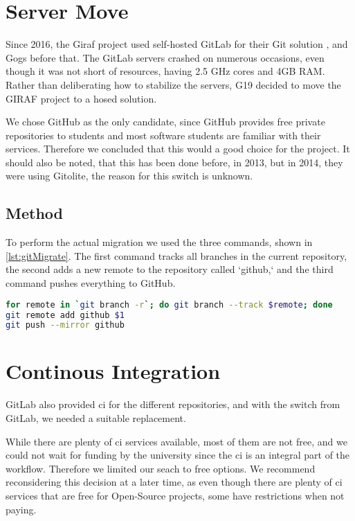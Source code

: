 \section{Server Move} \label{sec:GitAndCI}

Since 2016\cite{SW611F16}, the Giraf project used self-hosted GitLab for their Git solution , and Gogs before that\cite{SW603F15}. The GitLab servers crashed on numerous occasions, even though it was not short of resources, having 2.5 GHz cores and 4GB RAM. Rather than deliberating how to stabilize the servers, \gls{G19} decided to move the GIRAF project to a hosed solution.

We chose GitHub as the only candidate, since GitHub provides free private repositories to students and most software students are familiar with their services. Therefore we concluded that this would a good choice for the project. It should also be noted, that this has been done before, in 2013\cite{SW601F13}, but in 2014, they were using Gitolite\cite{SW613F14}, the reason for this switch is unknown.

\subsection{Method}

To perform the actual migration we used the three commands, shown in \autoref{lst:gitMigrate}. The first command tracks all branches in the current repository, the second adds a new remote to the repository called `github,` and the third command pushes everything to GitHub.

\begin{lstlisting}[language=bash,label={lst:gitMigrate},caption={Git Migration code}]
for remote in `git branch -r`; do git branch --track $remote; done
git remote add github $1
git push --mirror github
\end{lstlisting}

\section{Continous Integration}

GitLab also provided \gls{ci} for the different repositories, and with the switch from GitLab, we needed a suitable replacement.

While there are plenty of \gls{ci} services available, most of them are not free, and we could not wait for funding by the university since the \gls{ci} is an integral part of the workflow. Therefore we limited our seach to free options.  We recommend reconsidering this decision at a later time, as even though there are plenty of \gls{ci} services that are free for Open-Source projects, some have restrictions when not paying.

